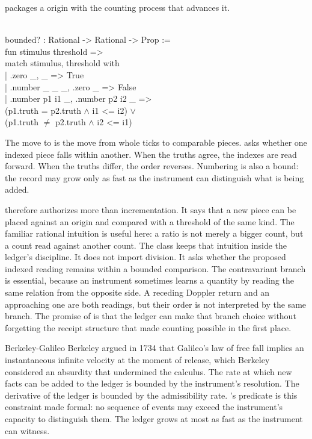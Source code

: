  packages a  origin with the counting
process that advances it.

\begin{leancode}
\\
bounded? : Rational -> Rational -> Prop :=\\
\quad\quad fun stimulus threshold =>\\
\quad\quad match stimulus, threshold with\\
\quad\quad | .zero \_, \_ => True\\
\quad\quad | .number \_ \_ \_, .zero \_ => False\\
\quad\quad | .number p1 i1 \_, .number p2 i2 \_ =>\\
\quad\quad\quad (p1.truth = p2.truth \(\wedge\) i1 <= i2) \(\vee\)\\
\quad\quad\quad (p1.truth \(\neq\) p2.truth \(\wedge\) i2 <= i1)
\end{leancode}

The move to  is the move from whole ticks to comparable pieces.
 asks whether one indexed piece falls within another. When the
truths agree, the indexes are read forward. When the truths differ, the order
reverses. Numbering is also a bound: the record may grow only as fast as the
instrument can distinguish what is being added.

 therefore authorizes more than incrementation. It says that a
new piece can be placed against an origin and compared with a threshold of the
same kind. The familiar rational intuition is useful here: a ratio is not
merely a bigger count, but a count read against another count. The class keeps
that intuition inside the ledger's discipline. It does not import division.
It asks whether the proposed indexed reading remains within a bounded
comparison. The contravariant branch is essential, because an instrument
sometimes learns a quantity by reading the same relation from the opposite
side. A receding Doppler return and an approaching one are both readings, but
their order is not interpreted by the same branch. The promise of
 is that the ledger can make that branch choice without
forgetting the receipt structure that made counting possible in the first
place.

\begin{gphenom}{Berkeley-Galileo}
\label{ph:berkeley-galileo}
\GPhObs Berkeley argued in 1734 that Galileo's law of free fall implies an
instantaneous infinite velocity at the moment of release, which Berkeley
considered an absurdity that undermined the calculus.
\GPhCon The rate at which new facts can be added to the ledger is bounded by
the instrument's resolution. The derivative of the ledger is bounded
by the admissibility rate.
\GPhSeq {}'s  predicate is this constraint made
formal: no sequence of events may exceed the instrument's capacity to
distinguish them. The ledger grows at most as fast as the instrument can witness.
\end{gphenom}

